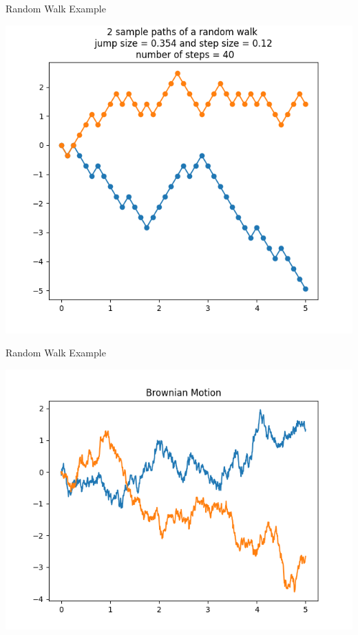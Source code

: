 \documentclass{beamer}%
\numberwithin{equation}{section}
\begin{document}
\begin{frame}{Random Walk Example}
	\begin{center}
		\includegraphics[scale=.6]{randomwalk40steps.png}
	\end{center}
\end{frame}


\begin{frame}{Random Walk Example}
	\begin{center}
		\includegraphics[scale=.7]{BrownianMotion.png}
	\end{center}
\end{frame}
\end{document}
